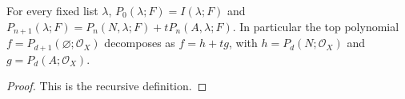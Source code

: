 \begin{lemma}
\label{lem:nef-ample-original-pencil-threshold-identity}
\leanok
{}
For every fixed list $\lambda$, $P_0(\lambda;F)=I(\lambda;F)$ and
$P_{n+1}(\lambda;F)=P_n(N,\lambda;F)+tP_n(A,\lambda;F)$. In particular the top polynomial
$f=P_{d+1}(\varnothing;\mathcal O_X)$ decomposes as $f=h+tg$, with
$h=P_d(N;\mathcal O_X)$ and $g=P_d(A;\mathcal O_X)$.
\end{lemma}
\begin{proof}
This is the recursive definition.
\end{proof}
